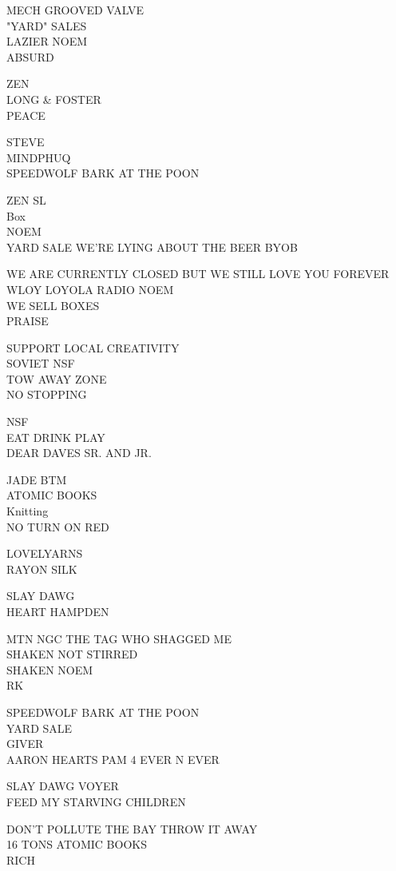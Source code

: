 \documentclass[10pt,letterpaper]{article}
\begin{document}
MECH GROOVED VALVE\\
"YARD" SALES\\
LAZIER NOEM\\
ABSURD

ZEN\\
LONG \& FOSTER\\
PEACE

STEVE\\
MINDPHUQ\\
SPEEDWOLF BARK AT THE POON

ZEN SL\\
Box\\
NOEM\\
YARD SALE WE'RE LYING ABOUT THE BEER BYOB

WE ARE CURRENTLY CLOSED BUT WE STILL LOVE YOU FOREVER\\
WLOY LOYOLA RADIO NOEM\\
WE SELL BOXES\\
PRAISE

SUPPORT LOCAL CREATIVITY\\
SOVIET NSF\\
TOW AWAY ZONE\\
NO STOPPING

NSF\\
EAT DRINK PLAY\\
DEAR DAVES SR. AND JR.

JADE BTM\\
ATOMIC BOOKS\\
Knitting\\
NO TURN ON RED

LOVELYARNS\\
RAYON SILK

SLAY DAWG\\
HEART HAMPDEN

MTN NGC THE TAG WHO SHAGGED ME\\
SHAKEN NOT STIRRED\\
SHAKEN NOEM\\
RK

SPEEDWOLF BARK AT THE POON\\
YARD SALE\\
GIVER\\
AARON HEARTS PAM 4 EVER N EVER

SLAY DAWG VOYER\\
FEED MY STARVING CHILDREN

DON'T POLLUTE THE BAY THROW IT AWAY\\
16 TONS ATOMIC BOOKS\\
RICH
\end{document}
